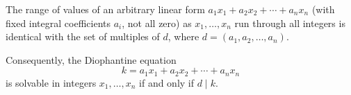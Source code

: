 The range of values of an arbitrary linear form $a_1 x_1 + a_2 x_2 + \cdots + a_n x_n$ (with fixed integral coefficients $a_i$, not all zero) as $x_1, \ldots, x_n$ run through all integers is identical with the set of multiples of $d$, where $d = (a_1, a_2, \ldots, a_n)$.

Consequently, the Diophantine equation
$$k = a_1 x_1 + a_2 x_2 + \cdots + a_n x_n$$
is solvable in integers $x_1, \ldots, x_n$ if and only if $d \mid k$.

